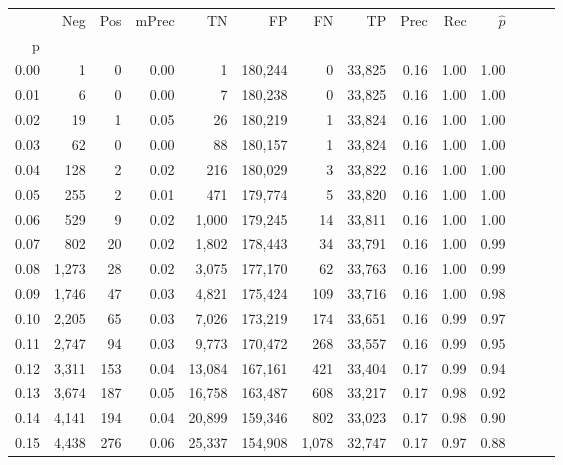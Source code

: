 \begin{tabular}{rrrrrrrrrrrrrr}
\toprule
{} &    Neg &  Pos & mPrec &       TN &       FP &      FN &      TP &  Prec &   Rec & $\hat{p}$ \\
p    &        &      &       &          &          &         &         &       &       &           \\
\midrule
0.00 &      1 &    0 &  0.00 &        1 &  180,244 &       0 &  33,825 &  0.16 &  1.00 &      1.00 \\
0.01 &      6 &    0 &  0.00 &        7 &  180,238 &       0 &  33,825 &  0.16 &  1.00 &      1.00 \\
0.02 &     19 &    1 &  0.05 &       26 &  180,219 &       1 &  33,824 &  0.16 &  1.00 &      1.00 \\
0.03 &     62 &    0 &  0.00 &       88 &  180,157 &       1 &  33,824 &  0.16 &  1.00 &      1.00 \\
0.04 &    128 &    2 &  0.02 &      216 &  180,029 &       3 &  33,822 &  0.16 &  1.00 &      1.00 \\
0.05 &    255 &    2 &  0.01 &      471 &  179,774 &       5 &  33,820 &  0.16 &  1.00 &      1.00 \\
0.06 &    529 &    9 &  0.02 &    1,000 &  179,245 &      14 &  33,811 &  0.16 &  1.00 &      1.00 \\
0.07 &    802 &   20 &  0.02 &    1,802 &  178,443 &      34 &  33,791 &  0.16 &  1.00 &      0.99 \\
0.08 &  1,273 &   28 &  0.02 &    3,075 &  177,170 &      62 &  33,763 &  0.16 &  1.00 &      0.99 \\
0.09 &  1,746 &   47 &  0.03 &    4,821 &  175,424 &     109 &  33,716 &  0.16 &  1.00 &      0.98 \\
0.10 &  2,205 &   65 &  0.03 &    7,026 &  173,219 &     174 &  33,651 &  0.16 &  0.99 &      0.97 \\
0.11 &  2,747 &   94 &  0.03 &    9,773 &  170,472 &     268 &  33,557 &  0.16 &  0.99 &      0.95 \\
0.12 &  3,311 &  153 &  0.04 &   13,084 &  167,161 &     421 &  33,404 &  0.17 &  0.99 &      0.94 \\
0.13 &  3,674 &  187 &  0.05 &   16,758 &  163,487 &     608 &  33,217 &  0.17 &  0.98 &      0.92 \\
0.14 &  4,141 &  194 &  0.04 &   20,899 &  159,346 &     802 &  33,023 &  0.17 &  0.98 &      0.90 \\
0.15 &  4,438 &  276 &  0.06 &   25,337 &  154,908 &   1,078 &  32,747 &  0.17 &  0.97 &      0.88 \\

\end{tabular}
